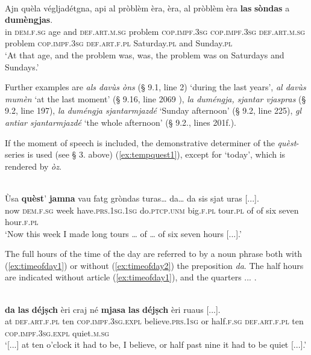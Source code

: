 \ea
\label{ex:tempdefart3}
\\
\gll  Ajn quèla végljadétgna, api al pròblèm èra, èra, al pròblèm èra \textbf{las} \textbf{sòndas} a \textbf{dumèngjas}.   \\
in  \textsc{dem.f.sg} age and \textsc{def.art.m.sg} problem \textsc{cop.impf.3sg} \textsc{cop.impf.3sg} \textsc{def.art.m.sg} problem \textsc{cop.impf.3sg} \textsc{def.art.f.pl} Saturday.\textsc{pl} and Sunday.\textsc{pl} \\
\glt `At that age, and the problem was, was, the problem was on Saturdays and Sundays.'
\z

Further examples are \textit{als davùs òns} (§ 9.1, line 2) `during the last years', \textit{al davùs mumèn} `at the last moment' (§ 9.16, line 2069 ), \textit{la duméngja, sjantar vjaspras} (§ 9.2, line 197), \textit{la duméngja sjantarmjazdé} `Sunday afternoon' (§ 9.2, line 225), \textit{gl antiar sjantarmjazdé} `the whole afternoon' (§ 9.2., lines 201f.).

If the moment of speech is included, the demonstrative determiner of the \textit{quèst}-series is used (see § 3. above) (\ref{ex:tempquest1}), except for `today', which is rendered by \textit{òz}.

\ea
\label{ex:tempquest1}
\\
\gll Ùsa \textbf{quèst}’ \textbf{jamna} vau fatg gròndas turas… da… da sis sjat uras [...].  \\
now \textsc{dem.f.sg} week have.\textsc{prs.1sg.1sg} do.\textsc{ptcp.unm} big.\textsc{f.pl} tour.\textsc{pl} of of six seven hour.\textsc{f.pl}\\
\glt `Now this week I made long tours … of … of six seven hours [...].'
\z

The full hours of the time of the day are referred to by a noun phrase both with (\ref{ex:timeofday1}) or without (\ref{ex:timeofday2}) the preposition \textit{da}. The half hours are indicated without article (\ref{ex:timeofday1}), and the quarters ... .

\ea
\label{ex:timeofday1}
\\
\gll    [...] \textbf{da} \textbf{las} \textbf{déjṣch} èri craj né \textbf{mjasa} \textbf{las} \textbf{déjṣch} èri ruaus [...].\\
{} at \textsc{def.art.f.pl} ten \textsc{cop.impf.3sg.expl} believe.\textsc{prs.1sg} or half.\textsc{f.sg} \textsc{def.art.f.pl} ten \textsc{cop.impf.3sg.expl} quiet.\textsc{m.sg}\\
\glt `[...] at ten o’clock it had to be, I believe, or half past nine it had to be quiet [...].'
\z

